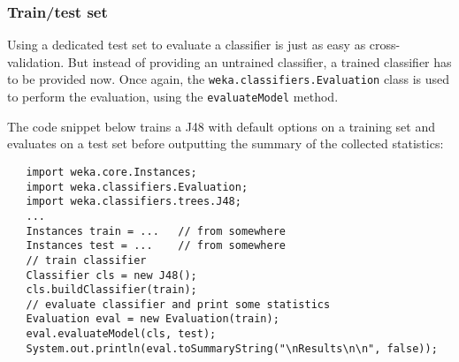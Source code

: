 \subsubsection*{Train/test set}
Using a dedicated test set to evaluate a classifier is just as easy as
cross-validation. But instead of providing an untrained classifier, a trained
classifier has to be provided now. Once again, the
\texttt{weka.classifiers.Evaluation} class is used to perform the evaluation,
using the \texttt{evaluateModel} method.

The code snippet below trains a J48 with default options on a training set and
evaluates on a test set before outputting the summary of the
collected statistics:
\begin{verbatim}
   import weka.core.Instances;
   import weka.classifiers.Evaluation;
   import weka.classifiers.trees.J48;
   ...
   Instances train = ...   // from somewhere
   Instances test = ...    // from somewhere
   // train classifier
   Classifier cls = new J48();
   cls.buildClassifier(train);
   // evaluate classifier and print some statistics
   Evaluation eval = new Evaluation(train);
   eval.evaluateModel(cls, test);
   System.out.println(eval.toSummaryString("\nResults\n\n", false));
\end{verbatim}

\newpage

